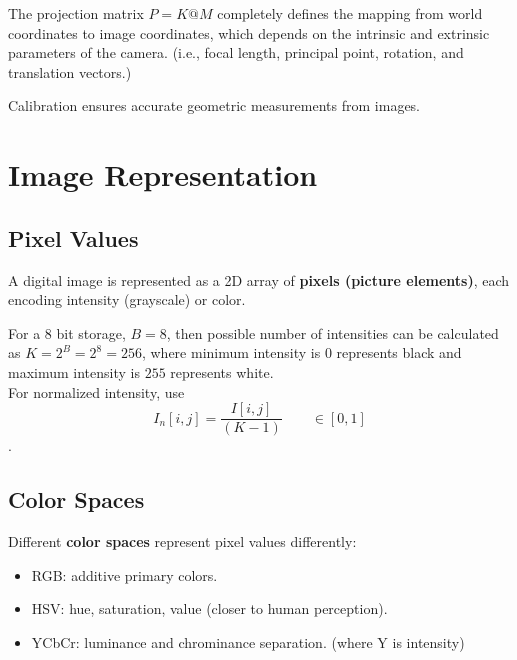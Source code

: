 {The projection matrix $P = K @ M$ completely defines the mapping from world coordinates to image coordinates, which depends on the intrinsic and extrinsic parameters of the camera. (i.e., focal length, principal point, rotation, and translation vectors.)}

Calibration ensures accurate geometric measurements from images.


\section{Image Representation}

\subsection{Pixel Values}
A digital image is represented as a 2D array of \textbf{pixels (picture elements)}, each encoding intensity (grayscale) or color.


\vspace{5pt}
\noindent For a 8 bit storage, $B = 8$, then possible number of intensities can be calculated as $K = 2^B = 2^8 = 256$, where minimum intensity is $0$ represents black and maximum intensity is $255$ represents white. \\

For normalized intensity, use $$I_n[i,j]=\frac{I[i,j]}{(K-1)} \qquad \in[0,1]$$.%

\subsection{Color Spaces}
Different \textbf{color spaces} represent pixel values differently:
\begin{itemize}
    \item RGB: additive primary colors.
    \item HSV: hue, saturation, value (closer to human perception).
    \item YCbCr: luminance and chrominance separation. (where Y is intensity)
\end{itemize}

